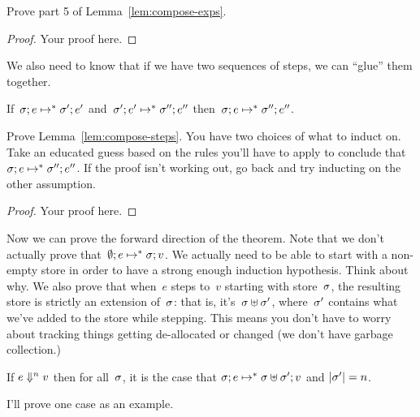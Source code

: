 \documentclass{article}
\begin{document}
\begin{task}
  Prove part 5 of Lemma~\ref{lem:compose-exps}.
\end{task}

\begin{proof}
  Your proof here.
\end{proof}
  
We also need to know that if we have two sequences of steps, we can ``glue''
them together.

\begin{lemma}\label{lem:compose-steps}
  If~$\cfg{\store}{e} \step^* \cfg{\store'}{e'}$
  and~$\cfg{\store'}{e'} \step^* \cfg{\store''}{e''}$
  then~$\cfg{\store}{e} \step^* \cfg{\store''}{e''}$.
\end{lemma}

\begin{task}
  Prove Lemma~\ref{lem:compose-steps}.
  You have two choices of what to induct on. Take an educated guess based on
  the rules you'll have to apply to conclude that
  $\cfg{\store}{e} \step^* \cfg{\store''}{e''}$.
  If the proof isn't working out, go back and try inducting on the other
  assumption.
\end{task}

\begin{proof}
  Your proof here.
\end{proof}

Now we can prove the forward direction of the theorem.
%
Note that we don't actually prove
that~$\cfg{\estore}{e} \step^* \cfg{\store}{v}$.
%
We actually need to be able to start with a non-empty store in order to
have a strong enough induction hypothesis.
%
Think about why.
%
We also prove that when~$e$ steps to~$v$ starting with store~$\store$,
the resulting store is strictly an extension of~$\store$: that is,
it's~$\stjoin{\store}{\store'}$, where~$\store'$ contains what we've added
to the store while stepping.
%
This means you don't have to worry about tracking things getting de-allocated
or changed (we don't have garbage collection.)

\begin{thm}\label{thm:forward}
  If $\eval[n]{e}{v}$ then for all~$\store$, it is the case that
  $\cfg{\store}{e} \step^* \cfg{\stjoin{\store}{\store'}}{v}$
  and $|\store'| = n$.
\end{thm}

I'll prove one case as an example.
\end{document}

